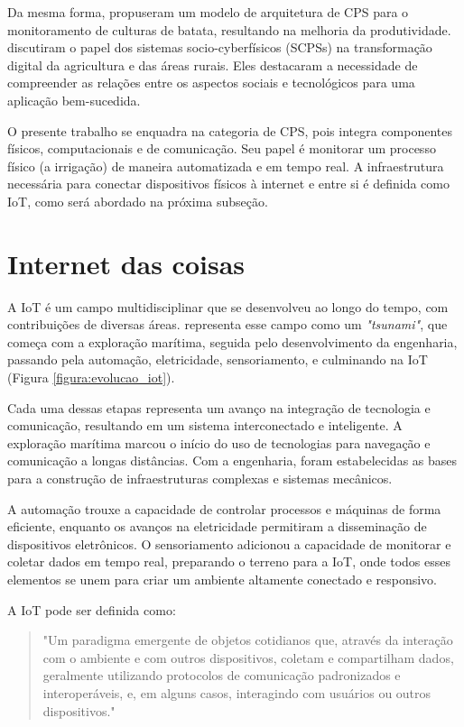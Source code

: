 Da mesma forma, \textcite{rad2015smart} propuseram um modelo de arquitetura de CPS para o monitoramento de culturas de batata, resultando na melhoria da produtividade. \textcite{rijswijk2021digital} discutiram o papel dos sistemas socio-cyberfísicos (SCPSs) na transformação digital da agricultura e das áreas rurais. Eles destacaram a necessidade de compreender as relações entre os aspectos sociais e tecnológicos para uma aplicação bem-sucedida.

O presente trabalho se enquadra na categoria de CPS, pois integra componentes físicos, computacionais e de comunicação. Seu papel é monitorar um processo físico (a irrigação) de maneira automatizada e em tempo real. A infraestrutura necessária para conectar dispositivos físicos à internet e entre si é definida como IoT, como será abordado na próxima subseção. 

\section{Internet das coisas}
A IoT é um campo multidisciplinar que se desenvolveu ao longo do tempo, com contribuições de diversas áreas. \textcite{datta2017} representa esse campo como um \textit{"tsunami"}, que começa com a exploração marítima, seguida pelo desenvolvimento da engenharia, passando pela automação, eletricidade, sensoriamento, e culminando na IoT (Figura \ref{figura:evolucao_iot}). 

Cada uma dessas etapas representa um avanço na integração de tecnologia e comunicação, resultando em um sistema interconectado e inteligente. A exploração marítima marcou o início do uso de tecnologias para navegação e comunicação a longas distâncias. Com a engenharia, foram estabelecidas as bases para a construção de infraestruturas complexas e sistemas mecânicos. 

A automação trouxe a capacidade de controlar processos e máquinas de forma eficiente, enquanto os avanços na eletricidade permitiram a disseminação de dispositivos eletrônicos. O sensoriamento adicionou a capacidade de monitorar e coletar dados em tempo real, preparando o terreno para a IoT, onde todos esses elementos se unem para criar um ambiente altamente conectado e responsivo.

A IoT pode ser definida como:

\begin{quote}
"Um paradigma emergente de objetos cotidianos que, através da interação com o ambiente e com outros dispositivos, coletam e compartilham dados, geralmente utilizando protocolos de comunicação padronizados e interoperáveis, e, em alguns casos, interagindo com usuários ou outros dispositivos." \parencite[{p. 44}]{kortuem2009things}
\end{quote}

